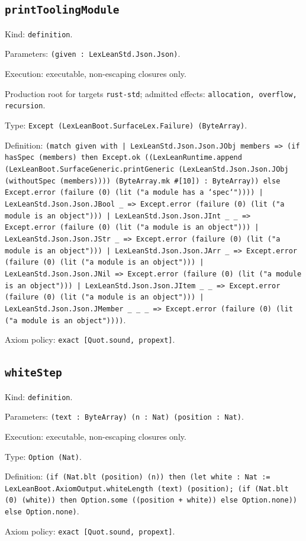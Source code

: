 \documentclass[11pt]{article}
\begin{document}
\subsection*{\texttt{printToolingModule}}
\noindent Kind: \texttt{definition}.\par
\noindent Parameters: \texttt{(given : LexLeanStd.Json.Json)}.\par
\noindent Execution: executable, non-escaping closures only.\par
\noindent Production root for targets \texttt{rust-std}; admitted effects: \texttt{allocation, overflow, recursion}.\par
\noindent Type: \texttt{Except (LexLeanBoot.SurfaceLex.Failure) (ByteArray)}.\par
\noindent Definition: \texttt{(match given with | LexLeanStd.Json.Json.JObj members => (if hasSpec (members) then Except.ok ((LexLeanRuntime.append (LexLeanBoot.SurfaceGeneric.printGeneric (LexLeanStd.Json.Json.JObj (withoutSpec (members)))) (ByteArray.mk \#[10]) : ByteArray)) else Except.error (failure (0) (lit ("a module has a `spec`")))) | LexLeanStd.Json.Json.JBool \_ => Except.error (failure (0) (lit ("a module is an object"))) | LexLeanStd.Json.Json.JInt \_ \_ => Except.error (failure (0) (lit ("a module is an object"))) | LexLeanStd.Json.Json.JStr \_ => Except.error (failure (0) (lit ("a module is an object"))) | LexLeanStd.Json.Json.JArr \_ => Except.error (failure (0) (lit ("a module is an object"))) | LexLeanStd.Json.Json.JNil => Except.error (failure (0) (lit ("a module is an object"))) | LexLeanStd.Json.Json.JItem \_ \_ => Except.error (failure (0) (lit ("a module is an object"))) | LexLeanStd.Json.Json.JMember \_ \_ \_ => Except.error (failure (0) (lit ("a module is an object"))))}.\par
\noindent Axiom policy: \texttt{exact [Quot.sound, propext]}.\par
\subsection*{\texttt{whiteStep}}
\noindent Kind: \texttt{definition}.\par
\noindent Parameters: \texttt{(text : ByteArray) (n : Nat) (position : Nat)}.\par
\noindent Execution: executable, non-escaping closures only.\par
\noindent Type: \texttt{Option (Nat)}.\par
\noindent Definition: \texttt{(if (Nat.blt (position) (n)) then (let white : Nat := LexLeanBoot.AxiomOutput.whiteLength (text) (position); (if (Nat.blt (0) (white)) then Option.some ((position + white)) else Option.none)) else Option.none)}.\par
\noindent Axiom policy: \texttt{exact [Quot.sound, propext]}.\par
\end{document}
